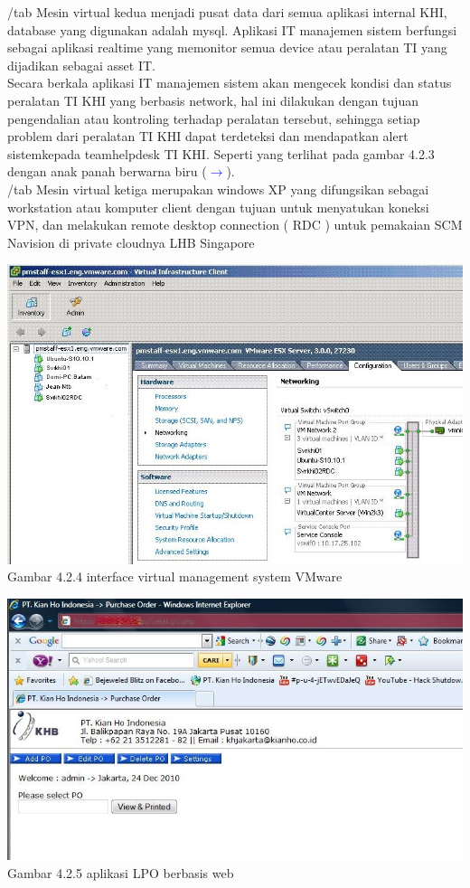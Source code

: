 /tab Mesin virtual kedua menjadi pusat data dari semua aplikasi internal KHI, database yang digunakan adalah mysql. Aplikasi IT manajemen sistem berfungsi sebagai aplikasi  realtime  yang  memonitor semua device atau peralatan TI yang dijadikan sebagai asset IT.\\
Secara berkala aplikasi IT manajemen sistem akan mengecek kondisi dan status peralatan TI KHI yang berbasis network, hal ini dilakukan dengan tujuan pengendalian atau kontroling terhadap peralatan tersebut, sehingga setiap problem dari peralatan  TI  KHI  dapat  terdeteksi dan mendapatkan alert sistemkepada teamhelpdesk TI KHI. Seperti  yang terlihat pada gambar 4.2.3 dengan anak panah berwarna biru (\textcolor{blue}{$\rightarrow$}).\\
/tab Mesin virtual ketiga merupakan windows XP yang difungsikan sebagai workstation atau komputer client dengan tujuan untuk menyatukan koneksi VPN, dan melakukan remote desktop connection ( RDC ) untuk pemakaian SCM Navision di private cloudnya LHB Singapore
\begin{center}
\includegraphics[scale=0.71]{gambar424.jpg} \\
Gambar 4.2.4 interface virtual management  system VMware
\end{center}
\begin{center}
\includegraphics[scale=0.71]{gambar425.jpg} \\
Gambar 4.2.5 aplikasi LPO berbasis web
\end{center}

